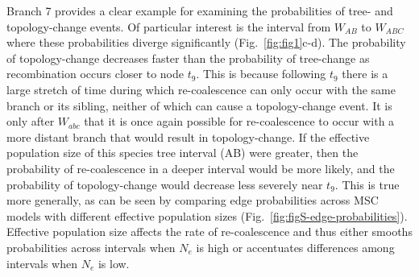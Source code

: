 \documentclass[11pt]{article}
\begin{document}

Branch 7 provides a clear example for examining the probabilities of 
tree- and topology-change events. Of particular interest is the 
interval from $W_{AB}$ to $W_{ABC}$ where these probabilities diverge 
significantly (Fig.~\ref{fig:fig1}c-d). 
The probability of topology-change decreases faster than the probability of 
tree-change as recombination occurs closer to node $t_9$. This is because 
following $t_9$ there is a large stretch of time during which re-coalescence can
only occur with the same branch or its sibling, neither of which can cause a topology-change
event. It is only after $W_{abc}$ that it is once again possible for re-coalescence
to occur with a more distant branch that would result in topology-change. 
If the effective population size of this species tree interval (AB) were greater,
then the probability of re-coalescence in a deeper interval would be more likely, 
and the probability of topology-change would decrease less severely near $t_9$. 
This is true more generally, as can be seen by comparing edge probabilities
across MSC models with different effective population sizes (Fig.~\ref{fig:figS-edge-probabilities}).
Effective population size affects the rate of re-coalescence and thus 
either smooths probabilities across intervals when 
$N_e$ is high or accentuates differences among intervals when $N_e$ is low.

\end{document}
